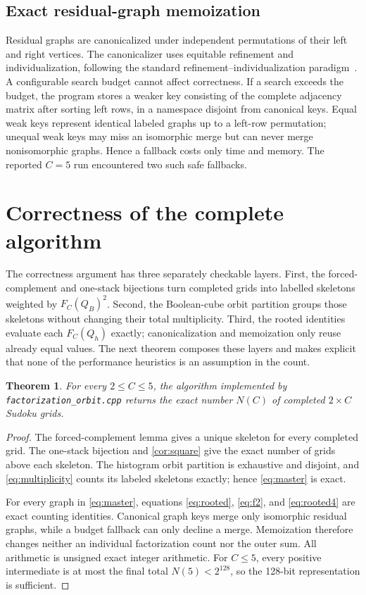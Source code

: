 \documentclass[11pt]{article}
\newtheorem{theorem}{Theorem}[section]
\theoremstyle{definition}
\theoremstyle{remark}
\begin{document}
\subsection{Exact residual-graph memoization}

Residual graphs are canonicalized under independent permutations of their
left and right vertices.  The canonicalizer uses equitable refinement and
individualization, following the standard refinement--individualization
paradigm~\cite{mckay2014practical}.  A configurable search budget cannot
affect correctness.  If a search exceeds the budget, the program stores a
weaker key consisting of the complete adjacency matrix after sorting left
rows, in a namespace disjoint from canonical keys.  Equal weak keys represent
identical labeled graphs up to a left-row permutation; unequal weak keys may
miss an isomorphic merge but can never merge nonisomorphic graphs.  Hence a
fallback costs only time and memory.  The reported $C=5$ run encountered two
such safe fallbacks.

\section{Correctness of the complete algorithm}

The correctness argument has three separately checkable layers.  First, the
forced-complement and one-stack bijections turn completed grids into labelled
skeletons weighted by $F_C(Q_B)^2$.  Second, the Boolean-cube orbit partition
groups those skeletons without changing their total multiplicity.  Third, the
rooted identities evaluate each $F_C(Q_h)$ exactly; canonicalization and
memoization only reuse already equal values.  The next theorem composes these
layers and makes explicit that none of the performance heuristics is an
assumption in the count.

\begin{theorem}
For every $2\le C\le5$, the algorithm implemented by
\texttt{factorization\_orbit.cpp} returns the exact number $N(C)$ of completed
$2\times C$ Sudoku grids.
\end{theorem}

\begin{proof}
The forced-complement lemma gives a unique skeleton for every completed grid.
The one-stack bijection and \cref{cor:square} give the exact number of grids
above each skeleton.  The histogram orbit partition is exhaustive and
disjoint, and \eqref{eq:multiplicity} counts its labeled skeletons exactly;
hence \eqref{eq:master} is exact.

For every graph in \eqref{eq:master}, equations \eqref{eq:rooted},
\eqref{eq:f2}, and \eqref{eq:rooted4} are exact counting identities.
Canonical graph keys merge only isomorphic residual graphs, while a budget
fallback can only decline a merge.  Memoization therefore changes neither an
individual factorization count nor the outer sum.  All arithmetic is unsigned
exact integer arithmetic.  For $C\le5$, every positive intermediate is at most
the final total $N(5)<2^{128}$, so the 128-bit representation is sufficient.
\end{proof}
\end{document}
